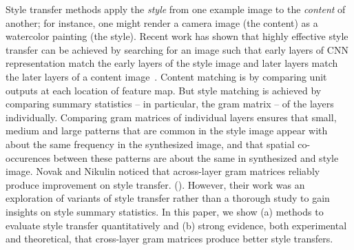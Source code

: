 \documentclass[runningheads]{llncs}
\begin{document}
Style transfer methods apply the {\em style} from one example image to the {\em content} of another; for instance, one might render a camera image (the content) as a watercolor painting (the style). Recent work has shown that highly effective style transfer can be achieved by searching for an image such that early layers of CNN representation match the early layers of the style image and later layers match the later layers of a content image~\cite{gatys2016image}. Content matching is by comparing unit outputs at each location of feature map. But style matching is achieved by comparing summary statistics -- in particular, the gram matrix -- of the layers individually. Comparing gram matrices of individual layers ensures that small, medium and large patterns that are common in the style image appear with about the same frequency in the synthesized image, and that spatial co-occurences between these patterns are about the same in synthesized and style image.  Novak and Nikulin noticed that across-layer gram matrices reliably produce improvement on style transfer. (\cite{novak2016improving}). However, their work was an exploration of variants of style transfer rather than a thorough study to gain insights on style summary statistics.   In this paper, we show (a) methods to evaluate style transfer quantitatively and (b) strong evidence, both experimental and theoretical, that cross-layer gram matrices produce better style transfers.
\end{document}
